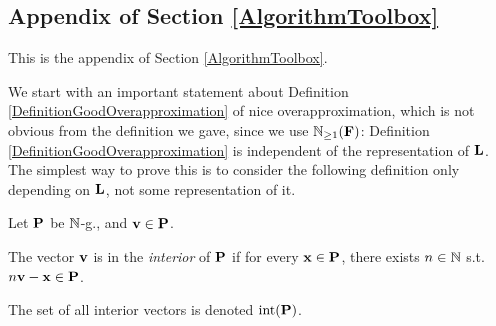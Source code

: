 

























































\subsection{Appendix of Section \ref{AlgorithmToolbox}}

This is the appendix of Section \ref{AlgorithmToolbox}. 

We start with an important statement about Definition \ref{DefinitionGoodOverapproximation} of nice overapproximation, which is not obvious from the definition we gave, since we use \(\mathbb{N}_{\geq 1}(\mathbf{F})\): Definition \ref{DefinitionGoodOverapproximation} is independent of the representation of \(\mathbf{L}\). The simplest way to prove this is to consider the following definition only depending on \(\mathbf{L}\), not some representation of it.

\begin{definition} \label{DefinitionInterior}
Let \(\mathbf{P}\) be \(\mathbb{N}\)-g., and \(\mathbf{v} \in \mathbf{P}\). 

The vector \(\mathbf{v}\) is in the \emph{interior} of \(\mathbf{P}\) if for every \(\mathbf{x} \in \mathbf{P}\), there exists \(n \in \mathbb{N}\) s.t. \(n \mathbf{v}-\mathbf{x} \in \mathbf{P}\).

The set of all interior vectors is denoted \(\operatorname{int}(\mathbf{P})\).
\end{definition}

